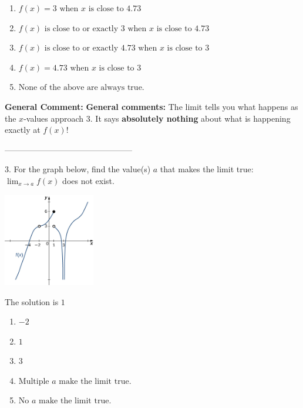 \documentclass{extbook}[14pt]
\begin{document}
\begin{enumerate}[label=\Alph*.] 
\item $ f(x) = 3 \text{ when } x \text{ is close to } 4.73 $ 

  
\item $ f(x) \text{ is close to or exactly } 3 \text{ when } x \text{ is close to } 4.73 $ 

  
\item $ f(x) \text{ is close to or exactly } 4.73 \text{ when } x \text{ is close to } 3 $ 

  
\item $ f(x) = 4.73 \text{ when } x \text{ is close to } 3 $ 

  
\item $ \text{None of the above are always true.} $ 

  
\end{enumerate} 
 
\textbf{General Comment:} \textbf{General comments:} The limit tells you what happens as the $x$-values approach $3$. It says \textbf{absolutely nothing} about what is happening exactly at $f(x)$! 

-----------------------------------------------

3. For the graph below, find the value(s) $a$ that makes the limit true: $ \displaystyle \lim_{x \rightarrow a} f(x)$ does not exist.
\begin{center} \includegraphics[width=0.3\textwidth]{../Figures/evaluateLimitGraphicallyC.png} \end{center} 

The solution is $ 1 $ 

\begin{enumerate}[label=\Alph*.] 
\item $ -2 $ 

  
\item $ 1 $ 

  
\item $ 3 $ 

  
\item $ \text{Multiple } a \text{ make the limit true}. $ 

  
\item $ \text{No } a \text{ make the limit true}. $ 

  
\end{enumerate} 
 
\end{document}
